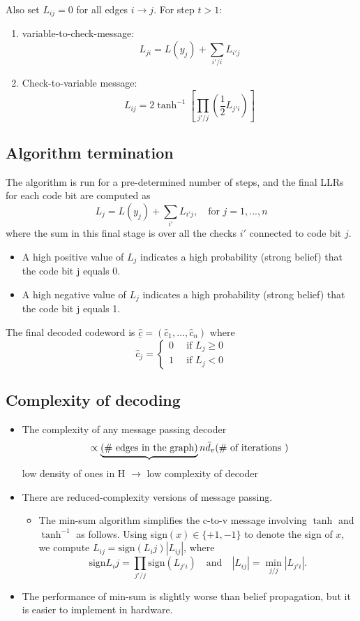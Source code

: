 \documentclass[12pt]{article}
\begin{document}
Also set $L_{ij} = 0$ for all edges $i\rightarrow j$. For step $t>1$:

\begin{enumerate}
    \item variable-to-check-message:
    \[
    L_{ji} = L(y_j) + \sum_{i'/i} L_{i'j}
    \]
    \item Check-to-variable message:
    \[
    L_{ij} = 2\tanh^{-1}\left[\prod_{j'/j}\left(\frac{1}{2}L_{j' i} \right)  \right]
    \]
\end{enumerate}
\subsection{Algorithm termination}
The algorithm is run for a pre-determined number of steps, and the final LLRs for each code bit are computed as 
\[
L_j =L(y_j) + \sum_{i'}L_{i'j}, \quad \textrm{for } j =1,...,n
\]
where the sum in this final stage is over all the checks $i'$ connected to code bit $j$.
\begin{itemize}
    \item A high positive value of $L_j$ indicates a high probability (strong belief) that the code bit j equals 0.
    \item A high negative value of  $L_j$ indicates a high probability (strong belief) that the code bit j equals 1.
\end{itemize}
The final decoded codeword is $\hat{\underline{c}} = (\hat{c}_1, ..., \hat{c}_n)$ where 
\[
\hat{c}_j = \left\{ \begin{array}{cc}
    0 &\, \textrm{ if } L_j \ge 0   \\
    1 &\, \textrm{ if } L_j < 0
\end{array}
\right.
\]



\subsection{Complexity of decoding}
\begin{itemize}
    \item The complexity of any message passing decoder
    \[
    \propto \underbrace{(\# \textrm{ edges in the graph} )}{n\Bar{d}_v} (\# \textrm{ of iterations })
    \]
    low density of ones in H $\rightarrow$ low complexity of decoder
    \item There are reduced-complexity versions of message passing.
    \begin{itemize}
        \item The \textrm{min-sum} algorithm simplifies the c-to-v message involving $\tanh$ and $\tanh^{-1}$ as follows. Using sign$(x)\in \{+1,-1 \}$ to denote the sign of $x$, we compute $L_{ij} = \textrm{sign}(L_ij)|L_{ij}|$, where 
        \[
        \textrm{sign}L_ij = \prod_{j'/j}\textrm{sign}(L_{j'i}) \quad \textrm{and} \quad |L_{ij}| = \min_{j/j}|L_{j'i}|. 
        \]
    \end{itemize}
    \item The performance of min-sum is slightly worse than belief propagation, but it is easier to implement in hardware.
\end{itemize}
\end{document}
